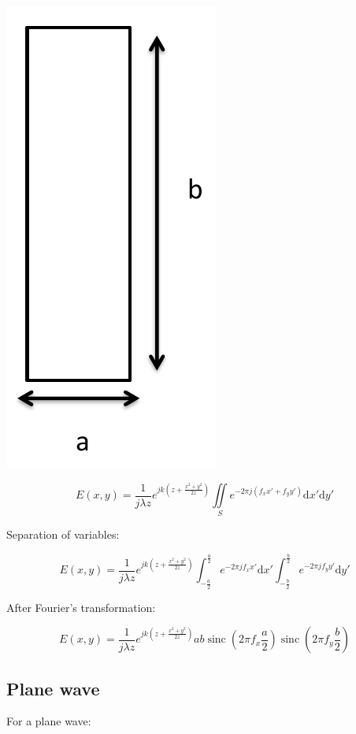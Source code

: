 \documentclass[10pt,a4paper]{article}
\DeclareMathOperator{\sinc}{sinc}
\begin{document}
\begin{center}
\includegraphics[scale=0.3]{../Ressources/schema-4-1.png}
\end{center}

\[E(x,y)=\frac{1}{j\lambda z} e^{jk\left(z+\frac{x^2+y^2}{2z}\right)}\iint\limits_S e^{-2\pi j(f_xx'+f_yy')}\mathrm{d}x'\mathrm{d}y'\]

Separation of variables:

\[
E(x,y)=\frac{1}{j\lambda z} e^{jk\left(z+\frac{x^2+y^2}{2z}\right)}
\int_{-\frac{a}{2}}^\frac{a}{2} e^{-2\pi jf_xx'}\mathrm{d}x'
\int_{-\frac{b}{2}}^\frac{b}{2} e^{-2\pi jf_yy'}\mathrm{d}y'
\]

After Fourier’s transformation:

\[
E(x,y)=\frac{1}{j\lambda z} e^{jk\left(z+\frac{x^2+y^2}{2z}\right)}ab
\sinc\left(2\pi f_x \frac{a}{2}\right)
\sinc\left(2\pi f_y \frac{b}{2}\right)
\]

\subsection{Plane wave}

For a plane wave:
\end{document}
